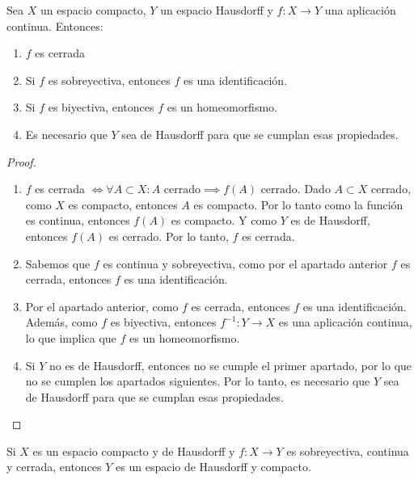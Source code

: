 \begin{proposición}
    Sea $X$ un espacio compacto, $Y$ un espacio Hausdorff y $f: X \to Y$ una aplicación continua. Entonces: 
    \begin{enumerate}
        \item $f$ es cerrada
        \item Si $f$ es sobreyectiva, entonces $f$ es una identificación.
        \item Si $f$ es biyectiva, entonces $f$ es un homeomorfismo.
        \item Es necesario que $Y$ sea de Hausdorff para que se cumplan esas propiedades. 
    \end{enumerate}
\end{proposición}
\begin{proof}
    \begin{enumerate}
        \item $f$ es cerrada $\iff \forall A \subset X : A \text{ cerrado} \implies f(A) \text{ cerrado}$. Dado $A  \subset X$ cerrado, como $X$ es compacto, entonces $A$ es compacto. Por lo tanto como la función es continua, entonces $f(A)$ es compacto. Y como $Y$ es de Hausdorff, entonces $f(A)$ es cerrado. Por lo tanto, $f$ es cerrada.
        \item Sabemos que $f$ es continua y sobreyectiva, como por el apartado anterior $f$ es cerrada, entonces $f$ es una identificación.
        \item Por el apartado anterior, como $f$ es cerrada, entonces $f$ es una identificación. Además, como $f$ es biyectiva, entonces $f^{-1}: Y \to X$ es una aplicación continua, lo que implica que $f$ es un homeomorfismo.
        \item Si $Y$ no es de Hausdorff, entonces no se cumple el primer apartado, por lo que no se cumplen los apartados siguientes. Por lo tanto, es necesario que $Y$ sea de Hausdorff para que se cumplan esas propiedades.
    \end{enumerate}  
\end{proof}
\begin{proposición}
    Si $X$ es un espacio compacto y de Hausdorff y $f: X \to Y$ es sobreyectiva, continua y cerrada, entonces $Y$ es un espacio de Hausdorff y compacto.
\end{proposición}
